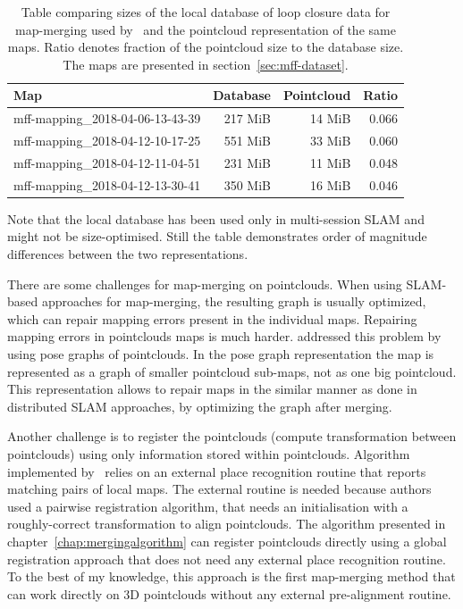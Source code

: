 \begin{table}[b!]

	\centering
	\begin{tabular}{lrr D{.}{.}{3}}
	\toprule
	\textbf{Map} & \textbf{Database} & \textbf{Pointcloud} & \textbf{Ratio} \\
	\midrule
	mff-mapping\_2018-04-06-13-43-39 & 217 MiB & 14 MiB & 0.066 \\
	mff-mapping\_2018-04-12-10-17-25 & 551 MiB & 33 MiB & 0.060 \\
	mff-mapping\_2018-04-12-11-04-51 & 231 MiB & 11 MiB & 0.048 \\
	mff-mapping\_2018-04-12-13-30-41 & 350 MiB & 16 MiB & 0.046 \\
	\bottomrule
	\end{tabular}
	\caption{Table comparing sizes of the local database of loop closure data for map-merging used by~\citet{labbe2014online} and the pointcloud representation of the same maps. Ratio denotes fraction of the pointcloud size to the database size. The maps are presented in section~\ref{sec:mff-dataset}.}
	\label{tabl:rtabmap-db-vs-pointclouds}
\end{table}

Note that the local database has been used only in multi-session \gls{SLAM} and might not be size-optimised. Still the table demonstrates order of magnitude differences between the two representations.

There are some challenges for map-merging on pointclouds. When using \gls{SLAM}-based approaches for map-merging, the resulting graph is usually optimized, which can repair mapping errors present in the individual maps. Repairing mapping errors in pointclouds maps is much harder. \citet{bonanni2017pose} addressed this problem by using pose graphs of pointclouds. In the pose graph representation the map is represented as a graph of smaller pointcloud sub-maps, not as one big pointcloud. This representation allows to repair maps in the similar manner as done in distributed \gls{SLAM} approaches, by optimizing the graph after merging.

Another challenge is to register the pointclouds (compute transformation between pointclouds) using only information stored within pointclouds. Algorithm implemented by~\citet{bonanni2017pose} relies on an external place recognition routine that reports matching pairs of local maps. The external routine is needed because authors used a pairwise registration algorithm, that needs an initialisation with a roughly-correct transformation to align pointclouds. The algorithm presented in chapter~\ref{chap:mergingalgorithm} can register pointclouds directly using a global registration approach that does not need any external place recognition routine. To the best of my knowledge, this approach is the first map-merging method
that can work directly on \gls{3D} pointclouds without any external pre-alignment routine.

